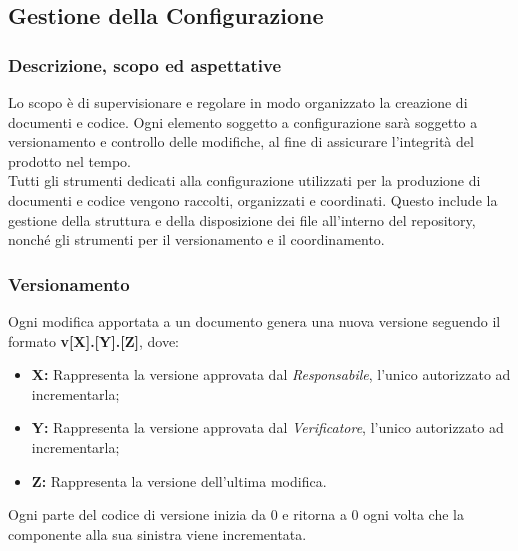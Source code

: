 \pagebreak
\pagebreak
\subsection{Gestione della Configurazione}

\subsubsection{Descrizione, scopo ed aspettative}
    Lo scopo è di supervisionare e regolare in modo organizzato la creazione di 
    documenti e codice. Ogni elemento soggetto a configurazione sarà soggetto a versionamento
    e controllo delle modifiche, al fine di assicurare l'integrità del prodotto 
    nel tempo.
    \\
    Tutti gli strumenti dedicati alla configurazione utilizzati per la produzione
    di documenti e codice vengono raccolti, organizzati e coordinati. Questo include
    la gestione della struttura e della disposizione dei file all'interno del repository, 
    nonché gli strumenti per il versionamento e il coordinamento.

\subsubsection{Versionamento}
Ogni modifica apportata a un documento genera una nuova versione seguendo il formato
\textbf{v[X].[Y].[Z]}, dove:
\begin{itemize}
    \item \textbf{X:} Rappresenta la versione approvata dal \emph{Responsabile}, l'unico autorizzato ad incrementarla;
    \item \textbf{Y:} Rappresenta la versione approvata dal \emph{Verificatore}, l'unico autorizzato ad incrementarla;
    \item \textbf{Z:} Rappresenta la versione dell'ultima modifica.
\end{itemize}
Ogni parte del codice di versione inizia da 0 e ritorna a 0 ogni volta che la componente alla sua sinistra
viene incrementata.
